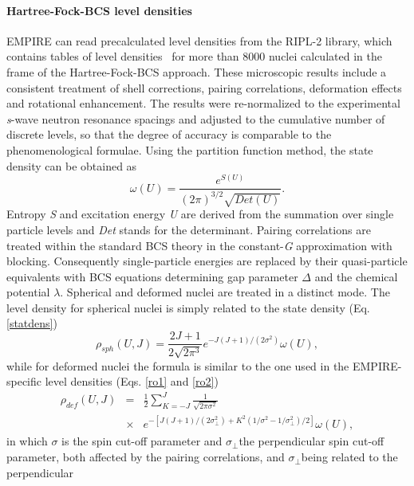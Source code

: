 \documentclass[twocolumn,amsmath,amssymb,10pt,groupedaddress,letter]{revtex4}
\begin{document}
\paragraph{Hartree-Fock-BCS level densities}
EMPIRE can read precalculated level densities
from the RIPL-2 library, which contains tables of level
densities~\cite{HFBCS} for more than 8000 nuclei calculated in the
frame of the Hartree-Fock-BCS approach. These microscopic results
include a consistent treatment of shell corrections, pairing correlations,
deformation effects and rotational enhancement. The results were re-normalized
to the experimental \emph{s}-wave neutron resonance spacings and adjusted
to the cumulative number of discrete levels, so that the degree of
accuracy is comparable to the phenomenological formulae.
Using the partition function method, the state density can be obtained
as
\begin{equation}
\omega(U)=\frac{e^{S(U)}}{(2\pi)^{3/2}\sqrt{Det(U)}}.
\label{statdens}
\end{equation}
 Entropy \emph{S} and excitation energy \emph{U} are derived from
the summation over single particle levels and \emph{Det} stands for
the determinant. Pairing correlations are treated within the standard
BCS theory in the constant-\emph{G} approximation with blocking. Consequently
single-particle energies are replaced by their quasi-particle equivalents
with BCS equations determining gap parameter $\Delta$
and the chemical potential $\lambda$. Spherical and deformed nuclei
are treated in a distinct mode. The level density
for spherical nuclei is simply related to the state density (Eq. \ref{statdens})
\begin{equation}
\rho_{sph}(U,J)=\frac{2J+1}{2\sqrt{2\pi^{3}}}e^{-J(J+1)/(2\sigma^{2})}\omega(U),
\label{rhosph}
\end{equation}
while for deformed nuclei the formula is similar to the one used in
the EMPIRE-specific level densities (Eqs. \ref{ro1} and \ref{ro2})
\begin{eqnarray}
\rho_{def}(U,J)&=&\frac{1}{2}\sum_{K=-J}^{J}\frac{1}{\sqrt{2\pi\sigma^{2}}}\\
&\times&e^{-[J(J+1)/(2\sigma_{\bot}^{2})+K^{2}(1/\sigma^{2}-1/\sigma_{\perp}^{2})/2]}\omega(U),\nonumber
\label{rhodef}
\end{eqnarray}
in which $\sigma$ is the spin cut-off parameter and $\sigma_{\perp}$the
perpendicular spin cut-off parameter, both affected by the pairing
correlations, and $\sigma_{\perp}$being related to the perpendicular
\end{document}
